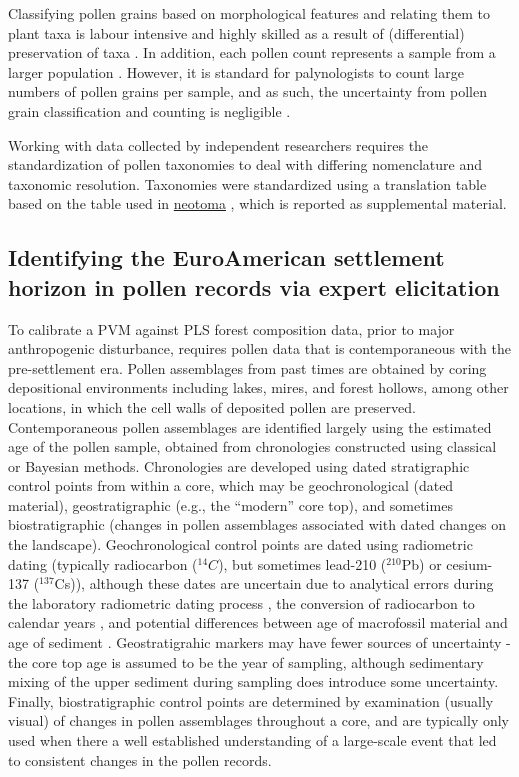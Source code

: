 \documentclass[12pt]{article}
\begin{document}
Classifying pollen grains based on morphological features and relating
them to plant taxa is labour intensive and highly skilled as a result
of (differential) preservation of taxa \citep{havinga1964,
  havinga1984}. In addition, each pollen count represents a sample
from a larger population \citep{maher2012assessment,
  maher1981statistics}. However, it is standard for palynologists to
count large numbers of pollen grains per sample, and as such, the
uncertainty from pollen grain classification and counting is
negligible \citep{webb1978sensing, webb1978mapped}.

Working with data collected by independent researchers requires the
standardization of pollen taxonomies to deal with differing
nomenclature and taxonomic resolution. Taxonomies were standardized
using a translation table based on the table used in \url{neotoma}
\citep{goring}, which is reported as supplemental material.

\subsection{Identifying the EuroAmerican settlement horizon in pollen records via expert elicitation}

To calibrate a PVM against PLS forest composition data, prior to major
anthropogenic disturbance, requires pollen data that is
contemporaneous with the pre-settlement era. Pollen assemblages from
past times are obtained by coring depositional environments including
lakes, mires, and forest hollows, among other locations, in which the
cell walls of deposited pollen are preserved. Contemporaneous pollen
assemblages are identified largely using the estimated age of the
pollen sample, obtained from chronologies constructed using classical
\citep{blaauw2010methods} or Bayesian \citep{blaauw2011flexible,
  buck1999bcal, blaauw2005radiocarbon, ramsey1995radiocarbon}
methods. Chronologies are developed using dated stratigraphic control
points from within a core, which may be geochronological (dated
material), geostratigraphic (e.g., the ``modern'' core top), and
sometimes biostratigraphic (changes in pollen assemblages associated
with dated changes on the landscape). Geochronological control points
are dated using radiometric dating (typically radiocarbon
(${}^{14}C$), but sometimes lead-210 ($^{210}$Pb) or cesium-137
($^{137}$Cs)), although these dates are uncertain due to analytical
errors during the laboratory radiometric dating process
\citep{ward1978procedures}, the conversion of radiocarbon to calendar
years \citep{reimer2013intcal13}, and potential differences between
age of macrofossil material and age of sediment
\citep{blois2011methodological}. Geostratigrahic markers may have
fewer sources of uncertainty - the core top age is assumed to be the
year of sampling, although sedimentary mixing of the upper sediment
during sampling does introduce some uncertainty. Finally,
biostratigraphic control points are determined by examination (usually
visual) of changes in pollen assemblages throughout a core, and are
typically only used when there a well established understanding of a
large-scale event that led to consistent changes in the pollen
records.
\end{document}
